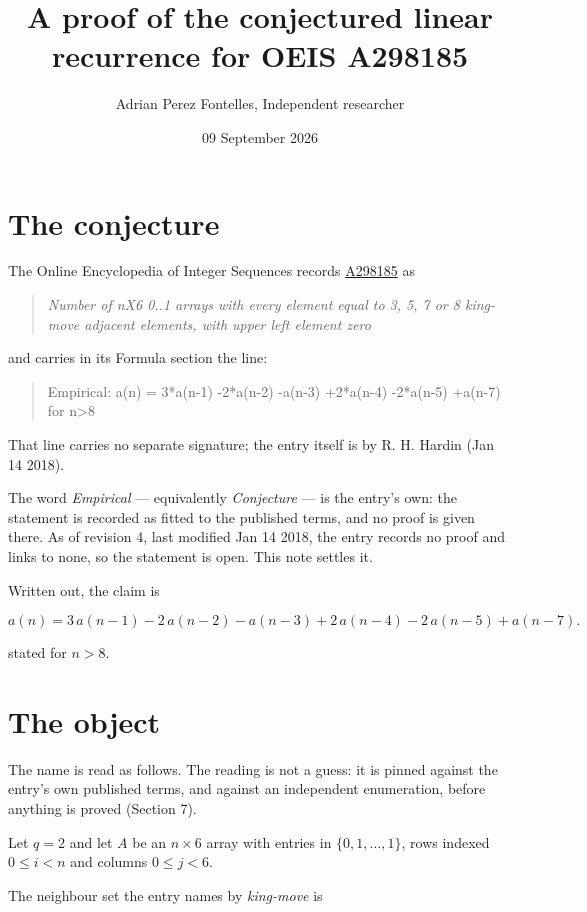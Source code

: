 \documentclass[11pt]{article}
\title{A proof of the conjectured linear recurrence for OEIS A298185}
\author{Adrian Perez Fontelles, Independent researcher}
\date{09 September 2026}
\theoremstyle{definition}
\begin{document}
\maketitle
\section{The conjecture}

The Online Encyclopedia of Integer Sequences records \href{https://oeis.org/A298185}{A298185} as

\begin{quote}\itshape Number of nX6 0..1 arrays with every element equal to 3, 5, 7 or 8 king-move adjacent elements, with upper left element zero\end{quote}

and carries in its Formula section the line:

\begin{quote}\ttfamily Empirical: a(n) = 3*a(n-1) -2*a(n-2) -a(n-3) +2*a(n-4) -2*a(n-5) +a(n-7) for n>8\end{quote}

That line carries no separate signature; the entry itself is by R. H. Hardin (Jan 14 2018).

The word {\itshape Empirical} --- equivalently {\itshape Conjecture} --- is the entry's own: the statement is recorded as fitted to the published terms, and no proof is given there. As of revision 4, last modified Jan 14 2018, the entry records no proof and links to none, so the statement is open. This note settles it.

Written out, the claim is

\[a(n) = 3\,a(n-1) - 2\,a(n-2) - a(n-3) + 2\,a(n-4) - 2\,a(n-5) + a(n-7).\]

stated for $n > 8$.

\section{The object}

The name is read as follows. The reading is not a guess: it is pinned against the entry's own published terms, and against an independent enumeration, before anything is proved (Section 7).

Let $q = 2$ and let $A$ be an $n \times 6$ array with entries in $\{0,1,\dots,1\}$, rows indexed $0 \le i < n$ and columns $0 \le j < 6$.

The neighbour set the entry names by {\itshape king-move} is
\end{document}
